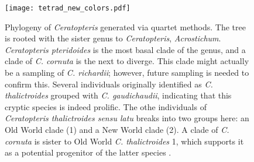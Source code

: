 \documentclass[12pt]{article}
\begin{document}
\begin{figure}[H]
\centering
\texttt{[image: tetrad\_new\_colors.pdf]}
\caption{Phylogeny of \textit{Ceratopteris} generated via quartet methods. The tree is rooted with the sister genus to \textit{Ceratopteris}, \textit{Acrostichum}. \textit{Ceratopteris pteridoides} is the most basal clade of the genus, and a clade of \textit{C. cornuta} is the next to diverge. This clade might actually be a sampling of \textit{C. richardii}; however, future sampling is needed to confirm this. Several individuals originally identified as \textit{C. thalictroides} grouped with \textit{C. gaudichaudii}, indicating that this cryptic species is indeed prolific. The othe individuals of \textit{Ceratopteris thalictroides sensu latu} breaks into two groups here: an Old World clade (1) and a New World clade (2). A clade of \textit{C. cornuta} is sister to Old World \textit{C. thalictroides} 1, which supports it as a potential progenitor of the latter species \autocite{Adjie2007}.}
\label{phy}
\end{figure}

\vspace{30cm}
\printbibliography
\end{document}
